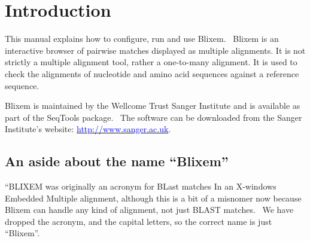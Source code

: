 \documentclass[letterpaper]{article}
\newcommand\textstyleInternetlink[1]{\textcolor{blue}{#1}}
\begin{document}
\bigskip

\setcounter{tocdepth}{10}
\renewcommand\contentsname{Contents}

\clearpage\tableofcontents

\clearpage
{\color[rgb]{0.0,0.27058825,0.5254902}\section[Introduction]{Introduction}}
\hypertarget{RefHeading1421056909880}{}{
{This manual explains how to configure, run and
use Blixem. \ }{Blixem is an interactive
browser of pairwise matches displayed as multiple alignments. It is not
strictly a multiple alignment tool, rather a
{\textquotesingle}one-to-many{\textquotesingle} alignment. It is used
to check the alignments of nucleotide and amino acid sequences against
a reference sequence.}}


\bigskip

{
{Blixem is maintained by the Wellcome Trust
Sanger Institute and is available as part of the SeqTools package.
\ The software can be downloaded from the Sanger
Institute{\textquoteright}s website:
}\href{http://www.sanger.ac.uk/}{\textstyleInternetlink{{http://www.sanger.ac.uk}}}{.}}

{\color[rgb]{0.30980393,0.5058824,0.7411765}\subsection[An aside about the name
{\textquotedblleft}Blixem{\textquotedblright}]{
An aside about the name {\textquotedblleft}Blixem{\textquotedblright}}}
\hypertarget{RefHeading1441056909880}{}{
{{\textquotedblleft}BLIXEM{\textquotedbl} was
originally an acronym for
}{{\textquotedbl}BLast matches In an X-windows
Embedded Multiple alignment{\textquotedbl}, although this is a bit of a
misnomer now because Blixem can handle any kind of alignment, not just
BLAST matches. \ We have dropped the acronym, and the capital letters,
so the correct name is just
{\textquotedblleft}Blixem{\textquotedblright}.}}
\end{document}
